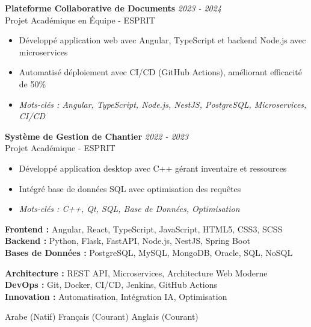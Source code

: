 \documentclass[11pt,a4paper]{article}
\begin{document}

\textbf{Plateforme Collaborative de Documents} \hfill \textit{2023 - 2024}\\[-2pt]
Projet Académique en Équipe - ESPRIT\\[-5pt]
\begin{itemize}[leftmargin=8pt,itemsep=1pt,topsep=2pt]
  \item Développé application web avec Angular, TypeScript et backend Node.js avec microservices
  \item Automatisé déploiement avec CI/CD (GitHub Actions), améliorant efficacité de 50\%
  \item[] \textit{\footnotesize Mots-clés : Angular, TypeScript, Node.js, NestJS, PostgreSQL, Microservices, CI/CD}
\end{itemize}\vspace{3pt}

\textbf{Système de Gestion de Chantier} \hfill \textit{2022 - 2023}\\[-2pt]
Projet Académique - ESPRIT\\[-5pt]
\begin{itemize}[leftmargin=8pt,itemsep=1pt,topsep=2pt]
  \item Développé application desktop avec C++ gérant inventaire et ressources
  \item Intégré base de données SQL avec optimisation des requêtes
  \item[] \textit{\footnotesize Mots-clés : C++, Qt, SQL, Base de Données, Optimisation}
\end{itemize}\vspace{3pt}

{\small
\begin{minipage}[t]{0.48\textwidth}
  \textbf{Frontend :} Angular, React, TypeScript, JavaScript, HTML5, CSS3, SCSS\\[1.5pt]
  \textbf{Backend :} Python, Flask, FastAPI, Node.js, NestJS, Spring Boot\\[1.5pt]
  \textbf{Bases de Données :} PostgreSQL, MySQL, MongoDB, Oracle, SQL, NoSQL
\end{minipage}
\hfill
\begin{minipage}[t]{0.48\textwidth}
  \textbf{Architecture :} REST API, Microservices, Architecture Web Moderne\\[1.5pt]
  \textbf{DevOps :} Git, Docker, CI/CD, Jenkins, GitHub Actions\\[1.5pt]
  \textbf{Innovation :} Automatisation, Intégration IA, Optimisation
\end{minipage}
}

Arabe (Natif) \textbar{} Français (Courant) \textbar{} Anglais (Courant)
\end{document}
